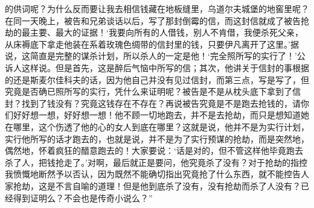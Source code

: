 的供词呢？为什么反而要让我去相信钱藏在地板缝里，乌道尔夫城堡的地窖里呢？在同一天晚上，被告和兄弟谈话以后，写了那封倒霉的信，而这封信就成了被告抢劫的最主要、最大的证据！‘我要向所有的人借钱，别人不肯借，我便杀死父亲，从床褥底下拿走他装在系着玫瑰色绸带的信封里的钱，只要伊凡离开了这里。’据说，这简直是完整的谋杀计划，所以杀人的一定是他！‘完全照所写的实行了！’公诉人这样说。但是首先，这是醉后气恼中所写的信；其次，他讲关于信封的事根据的还是斯麦尔佳科夫的话，因为他自己并没有见过信封，而第三点，写是写了，但究竟是否确已照所写的实行，凭什么来证明呢？被告是不是从枕头底下拿到了信封？找到了钱没有？究竟这钱存在不存在？再说被告究竟是不是跑去抢钱的，请你们好好想一想，好好想一想！他不顾一切地跑去，并不是去抢劫，而只是想知道她在哪里，这个伤透了他的心的女人到底在哪里？这就是说，他并不是为实行计划，实行他所写的话才跑去的，也就是说，并不是为了实行预谋的抢劫，而是突然地，偶然地，怀着疯狂的醋意跑去的！大家要说：‘话是对的，但不管这样他毕竟跑去杀了人，把钱抢走了。’对啊，最后就正是要问，他究竟杀了没有？对于抢劫的指控我愤慨地断然予以否认，因为既然不能确切指出究竟抢了什么东西，就不能控告人家抢劫，这是不言自喻的道理！但是他到底杀了没有，没有抢劫而杀了人没有？已经得到证明么？不会也是传奇小说么？”
